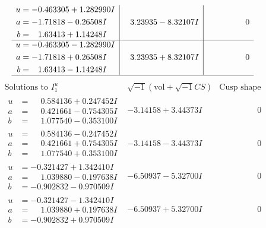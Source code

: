 \documentclass[1p]{elsarticle_modified}
\theoremstyle{definition}
\newcommand{\I}{\sqrt{-1}}
\begin{document}
$$\begin{array}{c|c|c}
\begin{aligned}
u &= -0.463305 + 1.282990 I \\
a &= -1.71818 - 0.26508 I \\
b &= \phantom{-}1.63413 + 1.14248 I\end{aligned}
 & \phantom{-}3.23935 - 8.32107 I & \phantom{-0.000000 } 0 \\ \hline\begin{aligned}
u &= -0.463305 - 1.282990 I \\
a &= -1.71818 + 0.26508 I \\
b &= \phantom{-}1.63413 - 1.14248 I\end{aligned}
 & \phantom{-}3.23935 + 8.32107 I & \phantom{-0.000000 } 0\\
 \hline 
 \end{array}$$\newpage$$\begin{array}{c|c|c}  
\text{Solutions to }I^u_{1}& \I (\text{vol} + \sqrt{-1}CS) & \text{Cusp shape}\\
 \hline 
\begin{aligned}
u &= \phantom{-}0.584136 + 0.247452 I \\
a &= \phantom{-}0.421661 - 0.754305 I \\
b &= \phantom{-}1.077540 - 0.353100 I\end{aligned}
 & -3.14158 + 3.44373 I & \phantom{-0.000000 } 0 \\ \hline\begin{aligned}
u &= \phantom{-}0.584136 - 0.247452 I \\
a &= \phantom{-}0.421661 + 0.754305 I \\
b &= \phantom{-}1.077540 + 0.353100 I\end{aligned}
 & -3.14158 - 3.44373 I & \phantom{-0.000000 } 0 \\ \hline\begin{aligned}
u &= -0.321427 + 1.342410 I \\
a &= \phantom{-}1.039880 - 0.197638 I \\
b &= -0.902832 - 0.970509 I\end{aligned}
 & -6.50937 - 5.32700 I & \phantom{-0.000000 } 0 \\ \hline\begin{aligned}
u &= -0.321427 - 1.342410 I \\
a &= \phantom{-}1.039880 + 0.197638 I \\
b &= -0.902832 + 0.970509 I\end{aligned}
 & -6.50937 + 5.32700 I & \phantom{-0.000000 } 0 \\ \hline\begin{aligned}

\end{aligned}
\end{array}$$
\end{document}
